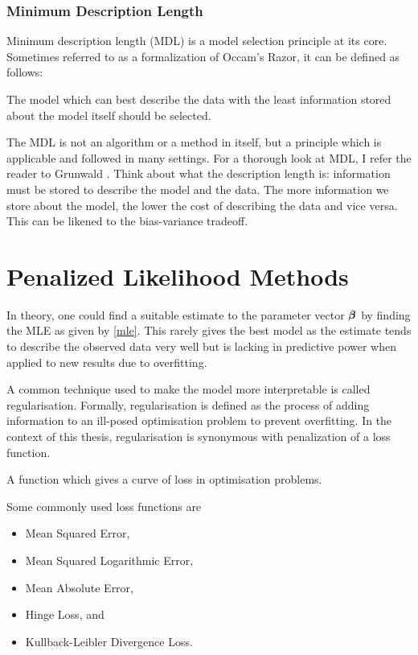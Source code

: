 \subsubsection{Minimum Description Length}\label{sec:mdl}

Minimum description length (MDL) is a model selection principle at its core. Sometimes referred to as a formalization of Occam's Razor, it can be defined as follows:

\begin{definition}\label{def:mdl}
The model which can best describe the data with the least information stored about the model itself should be selected.
\end{definition}

The MDL is not an algorithm or a method in itself, but a principle which is applicable and followed in many settings. For a thorough look at MDL, I refer the reader to Grunwald . Think about what the description length is: information must be stored to describe the model and the data. The more information we store about the model, the lower the cost of describing the data and vice versa. This can be likened to the bias-variance tradeoff.

\section{Penalized Likelihood Methods}

In theory, one could find a suitable estimate to the parameter vector $\boldsymbol{\beta}$ by finding the MLE as given by \cref{mle}. This rarely gives the best model as the estimate tends to describe the observed data very well but is lacking in predictive power when applied to new results due to overfitting.

A common technique used to make the model more interpretable is called regularisation. Formally, regularisation is defined as the process of adding information to an ill-posed optimisation problem to prevent overfitting. In the context of this thesis, regularisation is synonymous with penalization of a loss function.

\begin{definition}
A function which gives a curve of loss in optimisation problems.
\end{definition}

Some commonly used loss functions are 

\begin{itemize}
    \item Mean Squared Error,
    \item Mean Squared Logarithmic Error,
    \item Mean Absolute Error,
    \item Hinge Loss, and
    \item Kullback-Leibler Divergence Loss.
\end{itemize}

